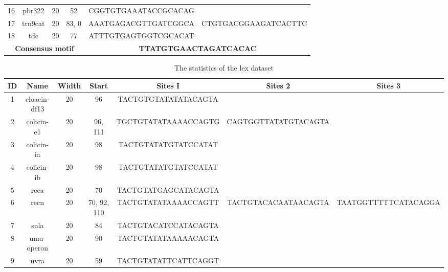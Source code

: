 \documentclass{article}
\begin{document}
\begin{table}
\begin{tabular}{|c|c|c|c|c|c|}
         16 &        pbr322 &         20 &      52 &  CGGTGTGAAATACCGCACAG &                                     \\
         17 &       trn9cat &         20 &   83, 0 &  AAATGAGACGTTGATCGGCA &  CTGTGACGGAAGATCACTTC               \\
         18 &           tdc &         20 &      77 &  ATTTGTGAGTGGTCGCACAT &                                   \\
\hline
   \multicolumn{4}{|c|}{\textbf{Consensus motif}}&     \multicolumn{2}{|c|}{\textbf{TTATGTGAACTAGATCACAC}}\\
\bottomrule
\end{tabular}
\end{table}

\begin{table}
\setlength\tabcolsep{1pt} %
\footnotesize
  \caption{The statistics of the lex dataset }
  \label{sample2}
\centering
\begin{tabular}{|c|c|c|c|c|c|c|}
\toprule
ID &  Name &  Width &        Start &          Sites I &         Sites 2 &        Sites 3 \\
\midrule
          1 &  cloacin-df13 &         20 &           96 &  TACTGTGTATATATACAGTA &                       &                       \\
          2 &    colicin-e1 &         20 &      96, 111 &  TGCTGTATATAAAACCAGTG &  CAGTGGTTATATGTACAGTA &                       \\
          3 &    colicin-ia &         20 &           98 &  TACTGTATATGTATCCATAT &                       &                       \\
          4 &    colicin-ib &         20 &           98 &  TACTGTATATGTATCCATAT &                       &                       \\
          5 &          reca &         20 &           70 &  TACTGTATGAGCATACAGTA &                       &                       \\
          6 &          recn &         20 &  70, 92, 110 &  TACTGTATATAAAACCAGTT &  TACTGTACACAATAACAGTA &  TAATGGTTTTTCATACAGGA \\
          7 &          sula &         20 &           84 &  TACTGTACATCCATACAGTA &                       &                       \\
          8 &    umu-operon &         20 &           90 &  TACTGTATATAAAAACAGTA &                       &                       \\
          9 &          uvra &         20 &           59 &  TACTGTATATTCATTCAGGT &                       &                       \\

\end{tabular}
\end{table}
\end{document}
